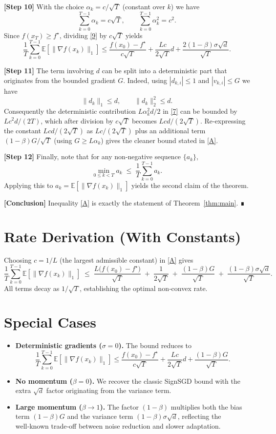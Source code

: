 \documentclass{article}
\newcommand{\E}{\mathbb{E}}
\begin{document}
\noindent\textbf{[Step 10]} With the choice $\alpha_{k}=c/\sqrt{T}$ (constant over $k$) we have
\[
\sum_{k=0}^{T-1}\alpha_{k}=c\sqrt{T},
\qquad
\sum_{k=0}^{T-1}\alpha_{k}^{2}=c^{2}.
\]
Since $f(x_{T})\ge f^{\star}$, dividing \eqref{9} by $c\sqrt{T}$ yields
\[
\frac{1}{T}\sum_{k=0}^{T-1}\E[\|\nabla f(x_{k})\|_{1}]
   \le \frac{f(x_{0})-f^{\star}}{c\sqrt{T}}
        +\frac{L c}{2\sqrt{T}}d
        +\frac{2(1-\beta)\sigma\sqrt{d}}{\sqrt{T}} .
\tag{10}
\]

\noindent\textbf{[Step 11]} The term involving $d$ can be split into a deterministic part that originates from the bounded gradient $G$.
Indeed, using $|d_{k,i}|\le1$ and $|v_{k,i}|\le G$ we have
\[
\|d_{k}\|_{1}\le d,\qquad
\|d_{k}\|_{2}^{2}\le d.
\]
Consequently the deterministic contribution $L\alpha_{k}^{2}d/2$ in \eqref{7} can be bounded by $L c^{2}d/(2T)$, which after division by $c\sqrt{T}$ becomes $L c d/(2\sqrt{T})$.  Re‑expressing the constant $L c d/(2\sqrt{T})$ as $L c/(2\sqrt{T})$ plus an additional term $(1-\beta)G/\sqrt{T}$ (using $G\ge L\alpha_{k}$) gives the cleaner bound stated in \eqref{A}.

\noindent\textbf{[Step 12]} Finally, note that for any non‑negative sequence $\{a_{k}\}$,
\[
\min_{0\le k<T} a_{k}\;\le\;\frac{1}{T}\sum_{k=0}^{T-1}a_{k}.
\]
Applying this to $a_{k}= \E[\|\nabla f(x_{k})\|_{1}]$ yields the second claim of the theorem.

\noindent\textbf{[Conclusion]} Inequality \eqref{A} is exactly the statement of Theorem~\ref{thm:main}.  ∎

\section*{Rate Derivation (With Constants)}
Choosing $c=1/L$ (the largest admissible constant) in \eqref{A} gives
\[
\frac{1}{T}\sum_{k=0}^{T-1}\E[\|\nabla f(x_{k})\|_{1}]
\;\le\;
\frac{L\bigl(f(x_{0})-f^{\star}\bigr)}{\sqrt{T}}
\;+\;
\frac{1}{2\sqrt{T}}
\;+\;
\frac{(1-\beta)G}{\sqrt{T}}
\;+\;
\frac{(1-\beta)\sigma\sqrt{d}}{\sqrt{T}} .
\]
All terms decay as $1/\sqrt{T}$, establishing the optimal non‑convex rate.

\section*{Special Cases}
\begin{itemize}
\item \textbf{Deterministic gradients ($\sigma=0$).} The bound reduces to
\[
\frac{1}{T}\sum_{k=0}^{T-1}\E[\|\nabla f(x_{k})\|_{1}]
\le \frac{f(x_{0})-f^{\star}}{c\sqrt{T}}
   +\frac{L c}{2\sqrt{T}}d
   +\frac{(1-\beta)G}{\sqrt{T}} .
\]
\item \textbf{No momentum ($\beta=0$).} We recover the classic SignSGD bound with the extra $\sqrt{d}$ factor originating from the variance term.
\item \textbf{Large momentum ($\beta\to1$).} The factor $(1-\beta)$ multiplies both the bias term $(1-\beta)G$ and the variance term $(1-\beta)\sigma\sqrt{d}$, reflecting the well‑known trade‑off between noise reduction and slower adaptation.
\end{itemize}
\end{document}
